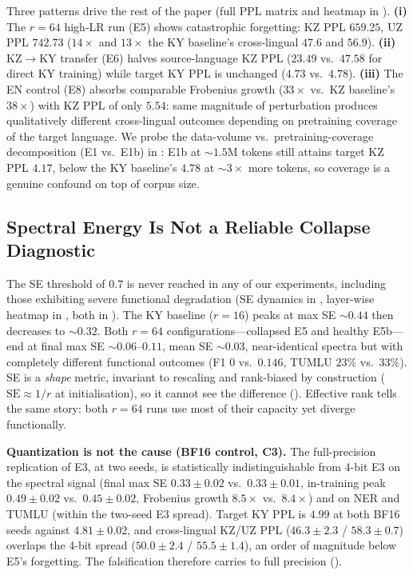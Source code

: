 \documentclass[11pt]{article}
\begin{document}
Three patterns drive the rest of the paper (full PPL matrix and heatmap in ). \textbf{(i)} The $r{=}64$ high-LR run (E5) shows catastrophic forgetting: KZ PPL $659.25$, UZ PPL $742.73$ ($14\times$ and $13\times$ the KY baseline's cross-lingual $47.6$ and $56.9$). \textbf{(ii)} KZ$\rightarrow$KY transfer (E6) halves source-language KZ PPL ($23.49$ vs.\ $47.58$ for direct KY training) while target KY PPL is unchanged ($4.73$ vs.\ $4.78$). \textbf{(iii)} The EN control (E8) absorbs comparable Frobenius growth ($33\times$ vs.\ KZ baseline's $38\times$) with KZ PPL of only $5.54$: same magnitude of perturbation produces qualitatively different cross-lingual outcomes depending on pretraining coverage of the target language. We probe the data-volume vs.\ pretraining-coverage decomposition (E1 vs.\ E1b) in : E1b at $\sim 1.5$M tokens still attains target KZ PPL $4.17$, below the KY baseline's $4.78$ at $\sim 3\times$ more tokens, so coverage is a genuine confound on top of corpus size.

\subsection{Spectral Energy Is Not a Reliable Collapse Diagnostic}
\label{sec:spectral}

The SE threshold of $0.7$ is never reached in any of our experiments, including those exhibiting severe functional degradation (SE dynamics in , layer-wise heatmap in , both in ). The KY baseline ($r{=}16$) peaks at max SE $\sim 0.44$ then decreases to $\sim 0.32$. Both $r{=}64$ configurations---collapsed E5 and healthy E5b---end at final max SE $\sim 0.06$--$0.11$, mean SE $\sim 0.03$, near-identical spectra but with completely different functional outcomes (F1 $0$ vs.\ $0.146$, TUMLU $23\%$ vs.\ $33\%$). SE is a \emph{shape} metric, invariant to rescaling and rank-biased by construction ($\text{SE}\approx 1/r$ at initialisation), so it cannot see the difference (). Effective rank tells the same story: both $r{=}64$ runs use most of their capacity yet diverge functionally.

\textbf{Quantization is not the cause (BF16 control, C3).} The full-precision replication of E3, at two seeds, is statistically indistinguishable from 4-bit E3 on the spectral signal (final max SE $0.33\pm0.02$ vs.\ $0.33\pm0.01$, in-training peak $0.49\pm0.02$ vs.\ $0.45\pm0.02$, Frobenius growth $8.5\times$ vs.\ $8.4\times$) and on NER and TUMLU (within the two-seed E3 spread). Target KY PPL is $4.99$ at both BF16 seeds against $4.81\pm0.02$, and cross-lingual KZ/UZ PPL ($46.3\pm2.3$ / $58.3\pm0.7$) overlaps the 4-bit spread ($50.0\pm2.4$ / $55.5\pm1.4$), an order of magnitude below E5's forgetting. The falsification therefore carries to full precision ().
\end{document}
